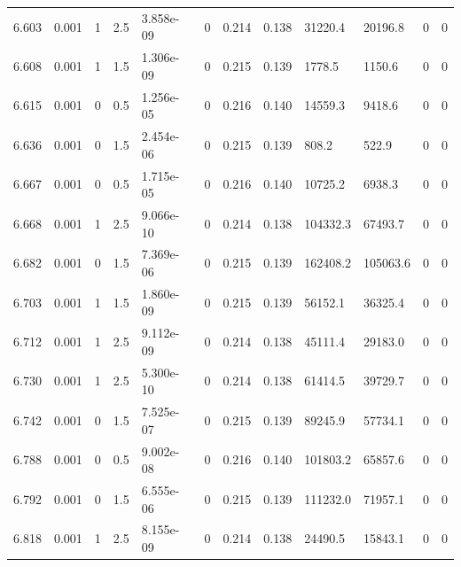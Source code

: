 \documentclass[preview]{standalone}
\begin{document}
{{{{{{{{{{{\begin{tabular}{L{1.2cm}C{1.2cm} C{0.3cm}C{0.5cm} C{1.4cm}C{1.4cm} C{1.4cm}C{1.4cm} C{1.6cm}C{1.6cm} C{1.6cm}C{1.6cm}}
  6.603  &  0.001  & 1     & 2.5 &  3.858e-09  & 0  &  0.214&   0.138& 31220.4 & 20196.8   &  0 & 0  \\ 
  6.608  &  0.001  & 1     & 1.5 &  1.306e-09  & 0  &  0.215&   0.139& 1778.5 & 1150.6   &  0 & 0  \\ 
  6.615  &  0.001  & 0     & 0.5 &  1.256e-05  & 0  &  0.216&   0.140& 14559.3 & 9418.6   &  0 & 0  \\ 
  6.636  &  0.001  & 0     & 1.5 &  2.454e-06  & 0  &  0.215&   0.139& 808.2 & 522.9   &  0 & 0  \\ 
  6.667  &  0.001  & 0     & 0.5 &  1.715e-05  & 0  &  0.216&   0.140& 10725.2 & 6938.3   &  0 & 0  \\ 
  6.668  &  0.001  & 1     & 2.5 &  9.066e-10  & 0  &  0.214&   0.138& 104332.3 & 67493.7   &  0 & 0  \\ 
  6.682  &  0.001  & 0     & 1.5 &  7.369e-06  & 0  &  0.215&   0.139& 162408.2 & 105063.6   &  0 & 0  \\ 
  6.703  &  0.001  & 1     & 1.5 &  1.860e-09  & 0  &  0.215&   0.139& 56152.1 & 36325.4   &  0 & 0  \\ 
  6.712  &  0.001  & 1     & 2.5 &  9.112e-09  & 0  &  0.214&   0.138& 45111.4 & 29183.0   &  0 & 0  \\ 
  6.730  &  0.001  & 1     & 2.5 &  5.300e-10  & 0  &  0.214&   0.138& 61414.5 & 39729.7   &  0 & 0  \\ 
  6.742  &  0.001  & 0     & 1.5 &  7.525e-07  & 0  &  0.215&   0.139& 89245.9 & 57734.1   &  0 & 0  \\ 
  6.788  &  0.001  & 0     & 0.5 &  9.002e-08  & 0  &  0.216&   0.140& 101803.2 & 65857.6   &  0 & 0  \\ 
  6.792  &  0.001  & 0     & 1.5 &  6.555e-06  & 0  &  0.215&   0.139& 111232.0 & 71957.1   &  0 & 0  \\ 
  6.818  &  0.001  & 1     & 2.5 &  8.155e-09  & 0  &  0.214&   0.138& 24490.5 & 15843.1   &  0 & 0  \\ 
\hline 
\end{tabular} 

}}}}}}}}}}}
\end{document}
